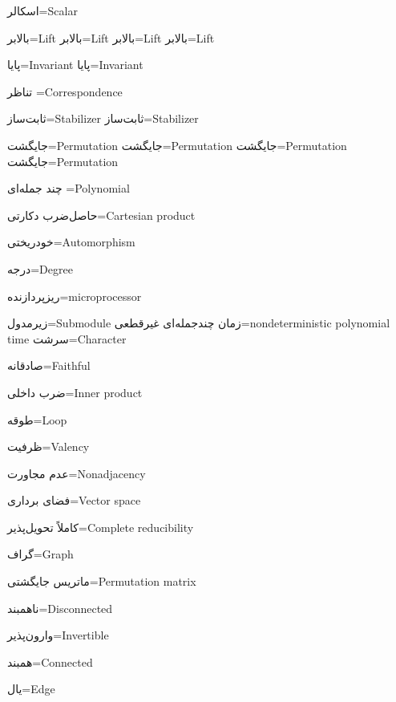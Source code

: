 اسکالر=Scalar

بالابر=Lift
بالابر=Lift
بالابر=Lift
بالابر=Lift


پایا=Invariant
پایا=Invariant

 تناظر =Correspondence

ثابت‌ساز=Stabilizer
ثابت‌ساز=Stabilizer

جایگشت=Permutation
جایگشت=Permutation
جایگشت=Permutation
جایگشت=Permutation

چند جمله‌ای =Polynomial

حاصل‌ضرب دکارتی=Cartesian product

خودریختی=Automorphism

درجه=Degree

ریزپردازنده=microprocessor

زیرمدول=Submodule
زمان چندجمله‌ای غیرقطعی=nondeterministic polynomial time
سرشت=Character

صادقانه=Faithful

ضرب داخلی=Inner product

طوقه=Loop

ظرفیت=Valency
 
عدم مجاورت=Nonadjacency

فضای برداری=Vector space

کاملاً تحویل‌پذیر=Complete reducibility

گراف=Graph

ماتریس جایگشتی=Permutation matrix 

ناهمبند=Disconnected

وارون‌پذیر=Invertible

همبند=Connected

یال=Edge

